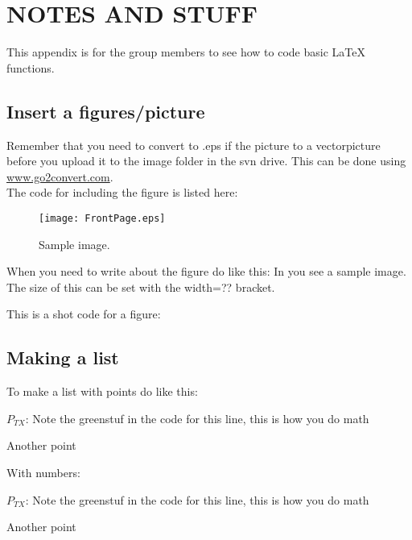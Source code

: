 \chapter{NOTES AND STUFF}

This appendix is for the group members to see how to code basic \LaTeX{} functions.
\section{Insert a figures/picture}
Remember that you need to convert to .eps if the picture to a vectorpicture before you upload it to the image folder in the svn drive. This can be done using \url{www.go2convert.com}.\\ %

The code for including the figure is listed here:

\begin{figure}[!h]
  \centering
  \texttt{[image: FrontPage.eps]}
  \caption{Sample image.}
  \label{fig:REMEMBER_TO_CHANGE_THE_LABEL}
\end{figure}

When you need to write about the figure do like this: In  you see a sample image. The size of this can be set with the width=?? bracket.

This is a shot code for a figure:

\section{Making a list}

To make a list with points do like this:
\begin{pitemize}
\item $P_{TX}$: Note the greenstuf in the code for this line, this is how you do math
\item Another point
\end{pitemize}

With numbers:
\begin{penumrate}
\item $P_{TX}$: Note the greenstuf in the code for this line, this is how you do math
\item Another point
\end{penumrate}

